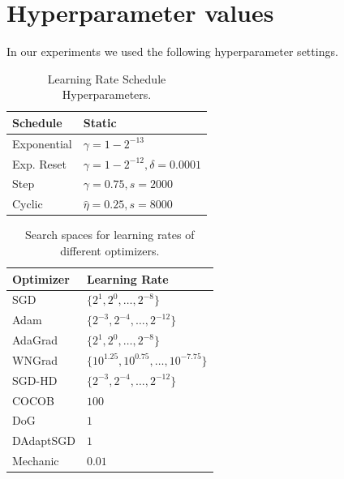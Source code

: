 \documentclass[letterpaper]{article} %
\begin{document}
\section{Hyperparameter values}\label{app:hyperparams}

In our experiments we used the following hyperparameter settings.

\begin{table}[H]
	\centering
	\begin{tabular}{ll}
		\toprule
		Schedule    & Static                            \\ \midrule
		Exponential & $\gamma=1-2^{-13}$                \\
		Exp. Reset  & $\gamma=1-2^{-12}, \delta=0.0001$ \\
		Step        & $\gamma=0.75, s=2000$             \\
		Cyclic      & $\hat{\eta}=0.25, s=8000$         \\ \bottomrule
	\end{tabular}
	\caption{Learning Rate Schedule Hyperparameters.}
\end{table}

\begin{table}[H]
	\centering
	\begin{tabular}{ll}
		\toprule
		Optimizer & Learning Rate                                  \\
		\midrule
		SGD       & $\{2^{1}, 2^{0}, \ldots, 2^{-8}\}$             \\
		Adam      & $\{2^{-3}, 2^{-4}, \ldots, 2^{-12}\}$          \\
		AdaGrad   & $\{2^{1}, 2^{0}, \ldots, 2^{-8}\}$             \\
		WNGrad    & $\{10^{1.25}, 10^{0.75}, \ldots, 10^{-7.75}\}$ \\
		SGD-HD    & $\{2^{-3}, 2^{-4}, \ldots, 2^{-12}\}$          \\ \midrule
		COCOB     & $100$                                          \\
		DoG       & $1$                                            \\
		DAdaptSGD & $1$                                            \\
		Mechanic  & $0.01$                                         \\
		\bottomrule
	\end{tabular}
	\caption{Search spaces for learning rates of different optimizers.}
\end{table}
\end{document}
